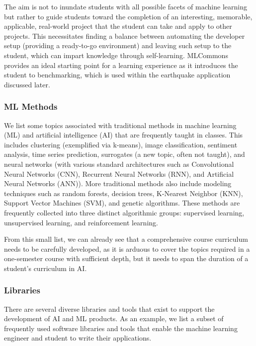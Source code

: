 \documentclass[utf8]{FrontiersinVancouver} %
\begin{document}
The aim is not to inundate students with all possible facets of
machine learning but rather to guide students toward the completion 
of an interesting, memorable, applicable, real-world project
that the student can take and apply to other projects. This necessitates finding a balance between automating the developer setup (providing a ready-to-go environment) and leaving such setup to the student, which can impart knowledge through self-learning. MLCommons provides an ideal starting point for a learning experience as it introduces the student to benchmarking, which is used within the earthquake application discussed later.

\subsubsection{ML Methods}

We list some topics associated with traditional methods in machine learning (ML) and artificial intelligence (AI) that are frequently taught in classes. This includes clustering (exemplified via k-means), image classification, sentiment analysis, time series prediction, surrogates (a new topic, often not taught), and neural networks (with various standard architectures such as Convolutional Neural Networks (CNN), Recurrent Neural Networks (RNN), and Artificial Neural Networks (ANN)). More traditional methods also include modeling techniques such as random forests, decision trees, K-Nearest Neighbor (KNN), Support Vector Machines (SVM), and genetic algorithms. These methods are frequently collected into three distinct algorithmic groups: supervised learning, unsupervised learning, and reinforcement learning.

From this small list, we can already see that a comprehensive course curriculum needs to be carefully developed, as it is arduous to cover the topics required in a one-semester course with sufficient depth, but it needs to span the duration of a student's curriculum in AI.

\subsubsection{Libraries}

There are several diverse libraries and tools that exist to support the development of AI and ML products. As an example, we list a subset of frequently used software libraries and tools that enable the machine learning engineer and student to write their applications.
\end{document}
